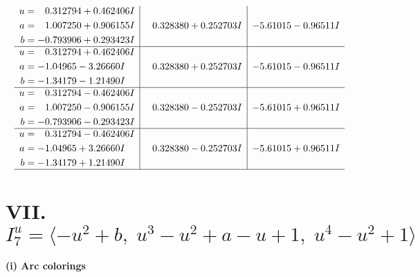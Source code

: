 \documentclass[1p]{elsarticle_modified}
\theoremstyle{definition}
\begin{document}
$$\begin{array}{c|c|c}
\begin{aligned}
u &= \phantom{-}0.312794 + 0.462406 I \\
a &= \phantom{-}1.007250 + 0.906155 I \\
b &= -0.793906 + 0.293423 I\end{aligned}
 & \phantom{-}0.328380 + 0.252703 I & -5.61015 - 0.96511 I \\ \hline\begin{aligned}
u &= \phantom{-}0.312794 + 0.462406 I \\
a &= -1.04965 - 3.26660 I \\
b &= -1.34179 - 1.21490 I\end{aligned}
 & \phantom{-}0.328380 + 0.252703 I & -5.61015 - 0.96511 I \\ \hline\begin{aligned}
u &= \phantom{-}0.312794 - 0.462406 I \\
a &= \phantom{-}1.007250 - 0.906155 I \\
b &= -0.793906 - 0.293423 I\end{aligned}
 & \phantom{-}0.328380 - 0.252703 I & -5.61015 + 0.96511 I \\ \hline\begin{aligned}
u &= \phantom{-}0.312794 - 0.462406 I \\
a &= -1.04965 + 3.26660 I \\
b &= -1.34179 + 1.21490 I\end{aligned}
 & \phantom{-}0.328380 - 0.252703 I & -5.61015 + 0.96511 I\\
 \hline 
 \end{array}$$\newpage\newpage\renewcommand{\arraystretch}{1}
\centering \section*{VII. $I^u_{7}= \langle - u^2+b,\;u^3- u^2+a- u+1,\;u^4- u^2+1 \rangle$}
\flushleft \textbf{(i) Arc colorings}\\
\end{document}
